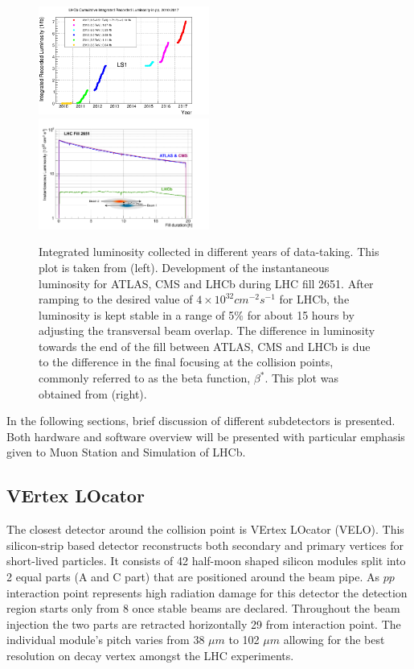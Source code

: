 \begin{figure}
	\centering
	\includegraphics[width = 0.5\textwidth]{figs/detector/intlumi.png}%
        \includegraphics[width = 0.5\textwidth]{figs/detector/lumicompare.png}
	\caption{Integrated luminosity collected in different years of data-taking. This plot is taken from \cite{lumiover} (left). Development of the instantaneous luminosity for \Gls{ATLAS}, \Gls{CMS} and \Gls{LHCb} during LHC fill 2651. After ramping to the desired value of $4\times10^{32}cm^{-2}s^{-1}$
for LHCb, the luminosity is kept stable in a range of 5$\%$ for about 15 hours by adjusting the transversal beam overlap. The difference in luminosity towards the end of the fill between ATLAS, CMS and LHCb is due to the difference in the final focusing at the collision points, commonly referred to as the beta function, $\beta^{*}$. This plot was obtained from \cite{LHCb-DP-2014-002} (right).}
	\label{fig:lhcbintlumi}
\end{figure}

In the following sections, brief discussion of different subdetectors is presented. Both hardware and software overview will be presented with particular emphasis given to Muon Station and Simulation of LHCb.

\subsection{VErtex LOcator}
The closest detector around the collision point is VErtex LOcator (\Gls{VELO}). This silicon-strip based detector reconstructs both secondary and primary vertices for short-lived particles. It consists of 42 half-moon shaped silicon modules split into 2 equal parts (A and C part) that are positioned around the beam pipe. As $pp$ interaction point represents high radiation damage for this detector the detection region starts only from 8 \mm once stable beams are declared. Throughout the beam injection the two parts are retracted horizontally 29 \mm from interaction point. The individual module's pitch varies from 38 $\mu m$ to 102 $\mu m$ allowing for the best resolution on decay vertex amongst the LHC experiments.


